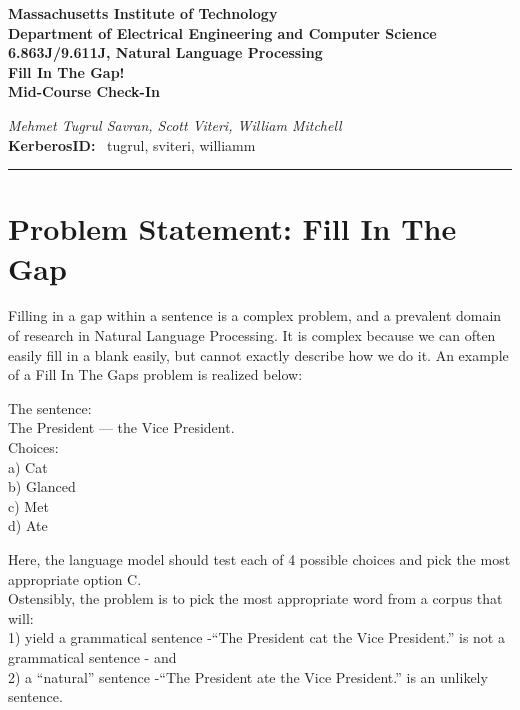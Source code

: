 \documentclass{article}[12pt]
\theoremstyle{definition}
\begin{document}
\begin{center}
{\bf Massachusetts Institute of Technology}\\
{\bf Department of Electrical Engineering and Computer Science}\\
{\bf 6.863J/9.611J,  Natural Language Processing}\\
{\bf Fill In The Gap!}\\
{\bf Mid-Course Check-In}
\end{center}

 \emph{Mehmet Tugrul Savran, Scott Viteri, William Mitchell}\\
{\bf KerberosID:} \
{tugrul, sviteri, williamm}\\


\hrule


\section{ Problem Statement: Fill In The Gap}

Filling in a gap within a sentence is a complex problem, and a prevalent domain of research in Natural Language Processing. It is complex because we can often easily fill in a blank easily, but cannot exactly describe how we do it. An example of a Fill In The Gaps problem is realized below: \\

\begin{flushleft}
The sentence: \\
The President --- the Vice President.\\
Choices:\\
a) Cat\\
b) Glanced\\
c) Met\\
d) Ate\\
\end{flushleft}

Here, the language model should test each of 4 possible choices and pick the most appropriate option C. \\

Ostensibly, the problem is to pick the most appropriate word from a corpus that will: \\

1) yield a grammatical sentence -“The President cat the Vice President.” is not a grammatical sentence -  and \\

2) a “natural” sentence -“The President ate the Vice President.” is an unlikely sentence. \\
\end{document}
